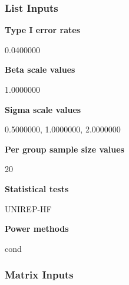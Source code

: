 \documentclass{glimmpse-report}
\begin{document}
\subsubsection{List Inputs}

{\bf Type I error rates}

0.0400000

{\bf Beta scale values}

1.0000000

{\bf Sigma scale values}

0.5000000, 1.0000000, 2.0000000

{\bf Per group sample size values}

20

{\bf Statistical tests}

UNIREP-HF

{\bf Power methods}

cond

\subsubsection{Matrix Inputs}
\end{document}
